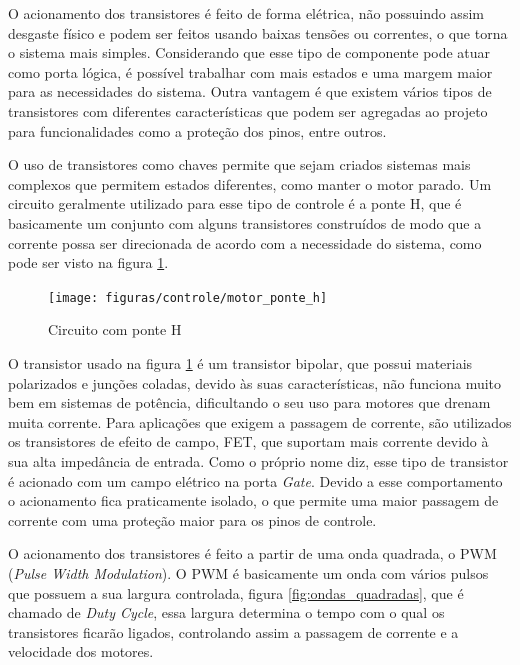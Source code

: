 O acionamento dos transistores é feito de forma elétrica, não possuindo assim desgaste físico e podem ser feitos usando baixas tensões ou correntes, o que torna o sistema mais simples. Considerando que esse tipo de componente pode atuar como porta lógica, é possível trabalhar com mais estados e uma margem maior para as necessidades do sistema. Outra vantagem é que existem vários tipos de transistores com diferentes características que podem ser agregadas ao projeto para funcionalidades como a proteção dos pinos, entre outros.

O uso de transistores como chaves permite que sejam criados sistemas mais complexos que permitem estados diferentes, como manter o motor parado. Um circuito geralmente utilizado para esse tipo de controle é a ponte H, que é basicamente um conjunto com alguns transistores construídos de modo que a corrente possa ser direcionada de acordo com a necessidade do sistema, como pode ser visto na figura \ref{fig:motor_ponte_h}.

\begin{figure}[!htb]
\centering
  \texttt{[image: figuras/controle/motor\_ponte\_h]}
\caption{Circuito com ponte H}
\label{fig:motor_ponte_h}
\end{figure}

O transistor usado na figura \ref{fig:motor_ponte_h} é um transistor bipolar, que possui materiais polarizados e junções coladas, devido às suas características, não funciona muito bem em sistemas de potência, dificultando o seu uso para motores que drenam muita corrente. Para aplicações que exigem a passagem de corrente, são utilizados os transistores de efeito de campo, FET, que suportam mais corrente devido à sua alta impedância de entrada. Como o próprio nome diz, esse tipo de transistor é acionado com um campo elétrico na porta \textit{Gate}. Devido a esse comportamento o acionamento fica praticamente isolado, o que permite uma maior passagem de corrente com uma proteção maior para os pinos de controle.

O acionamento dos transistores é feito a partir de uma onda quadrada, o PWM (\textit{Pulse Width Modulation}). O PWM é basicamente um onda com vários pulsos que possuem a sua largura controlada, figura \ref{fig:ondas_quadradas}, que é chamado de \textit{Duty Cycle}, essa largura determina o tempo com o qual os transistores ficarão ligados, controlando assim a passagem de corrente e a velocidade dos motores.

